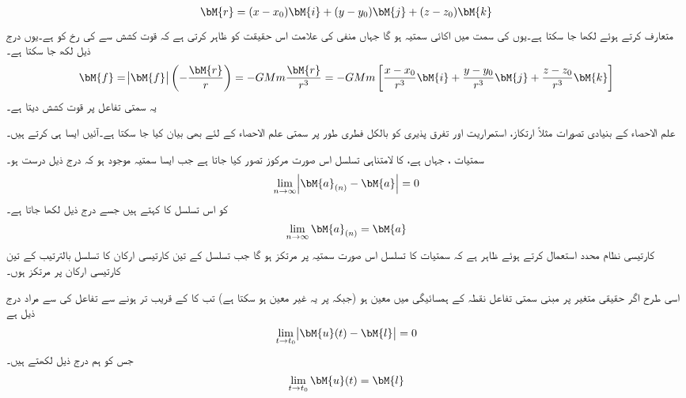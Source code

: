 \begin{align}
\bM{r}=(x-x_0)\bM{i}+(y-y_0)\bM{j}+(z-z_0)\bM{k}
\end{align}
متعارف کرتے ہوئے  لکھا جا سکتا ہے۔یوں  کی سمت میں اکائی سمتیہ   ہو گا جہاں منفی کی علامت اس حقیقت کو ظاہر کرتی ہے کہ قوت کشش  سے  کی رخ کو  ہے۔یوں درج ذیل لکھ جا سکتا ہے۔
\begin{align}
\bM{f}=\abs{\bM{f}}\left(-\frac{\bM{r}}{r}\right)=-GMm\frac{\bM{r}}{r^3}=-GMm\left[\frac{x-x_0}{r^3}\bM{i}+\frac{y-y_0}{r^3}\bM{j}+\frac{z-z_0}{r^3}\bM{k}\right]
\end{align}
یہ سمتی تفاعل  پر قوت کشش دیتا ہے۔

علم الاحصاء کے بنیادی تصورات  مثلاً ارتکاز، استمراریت اور تفرق پذیری کو  بالکل فطری طور پر سمتی علم الاحصاء کے لئے بھی  بیان کیا جا سکتا ہے۔آئیں ایسا ہی کرتے ہیں۔

سمتیات ، جہاں  ہے، کا لامتناہی تسلسل اس صورت مرکوز تصور کیا جاتا ہے جب ایسا سمتیہ  موجود ہو کہ درج ذیل درست ہو۔
\begin{align}
\lim_{n\to \infty} \abs{\bM{a}_{(n)}-\bM{a}}=0
\end{align}  
 کو اس تسلسل کا  کہتے ہیں جسے درج ذیل لکھا جاتا ہے۔
\begin{align}
\lim_{n\to \infty} \bM{a}_{(n)}=\bM{a}
\end{align}
کارتیسی نظام محدد استعمال کرتے ہوئے ظاہر ہے کہ سمتیات کا تسلسل اس صورت سمتیہ  پر مرتکز ہو گا جب تسلسل کے تین کارتیسی ارکان کا تسلسل بالترتیب  کے تین کارتیسی ارکان پر مرتکز ہوں۔

اسی طرح اگر حقیقی متغیر  پر مبنی سمتی تفاعل  نقطہ  کے ہمسائیگی میں معین ہو (جبکہ  پر یہ غیر معین ہو سکتا ہے) تب    کا  کے قریب تر ہونے سے تفاعل کی    سے مراد درج ذیل ہے
\begin{align}
\lim_{t\to t_0} \abs{\bM{u}(t)-\bM{l}}=0
\end{align}  
جس کو ہم درج ذیل لکھتے ہیں۔
\begin{align}
\lim_{t\to t_0} \bM{u}(t)=\bM{l}
\end{align}

